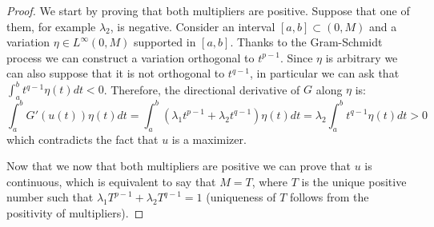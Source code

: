 \documentclass[corpo=11pt, stile=classica, tipotesi=custom,
greek, evenboxes, english]{toptesi}
\numberwithin{equation}{chapter}
\begin{document}
\begin{proof}
We start by proving that both multipliers are positive. Suppose that one of them, for example $\lambda_2$, is negative. Consider an interval $[a,b] \subset (0,M)$ and a variation $\eta \in L^{\infty}(0,M)$ supported in $[a,b]$. Thanks to the Gram-Schmidt process we can construct a variation orthogonal to $t^{p-1}$. Since $\eta$ is arbitrary we can also suppose that it is not orthogonal to $t^{q-1}$, in particular we can ask that $\int_{a}^{b}t^{q-1}\eta(t)dt <0$. Therefore, the directional derivative of $G$ along $\eta$ is:
\begin{equation*}
	\int_{a}^{b} G'(u(t))\eta(t)dt = \int_{a}^{b} (\lambda_1 t^{p-1} + \lambda_2 t^{q-1})\eta(t)dt = \lambda_2 \int_{a}^{b} t^{q-1} \eta(t)dt > 0
\end{equation*}
which contradicts the fact that $u$ is a maximizer.

Now that we now that both multipliers are positive we can prove that $u$ is continuous, which is equivalent to say that $M=T$, where $T$ is the unique positive number such that $\lambda_1 T^{p-1} + \lambda_2 T^{q-1} = 1$ (uniqueness of $T$ follows from the positivity of multipliers).


\end{proof}
\end{document}
